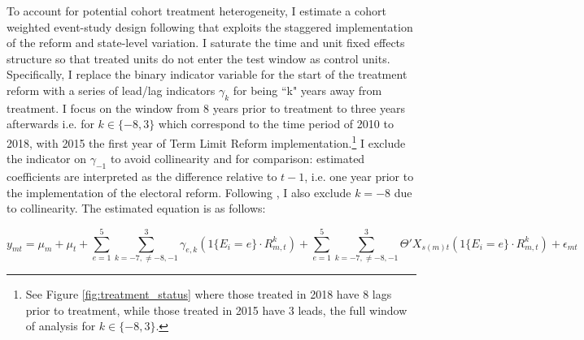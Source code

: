  To account for potential cohort treatment heterogeneity, I estimate  a cohort weighted event-study design following \citet{abraham_sun_2020} that exploits the staggered implementation of the reform and state-level variation. 
 I saturate the time and unit fixed effects structure so that treated units do not enter the test window as control units. Specifically, I replace the binary indicator variable for the start of the treatment reform with a series of lead/lag indicators $\gamma_k$ for being ``k" years away from treatment. I focus on the window from 8 years prior to treatment to three years afterwards i.e. for $k \in \{-8,3\} $ which correspond to the time period of 2010 to 2018, with 2015 the first year of Term Limit Reform implementation.\footnote{See Figure \ref{fig:treatment_status} where those treated in 2018 have 8 lags prior to treatment, while those treated in 2015 have 3 leads, the full window of analysis for $k \in \{-8,3\} $.} %
I exclude the indicator on $\gamma_{-1}$ to avoid collinearity and for comparison: estimated coefficients are interpreted as the difference relative to $t-1$, i.e. one year prior to the implementation of the electoral reform. Following   \citet{abraham_sun_2020}, I also exclude $k=-8$ due to collinearity. The estimated equation is as follows:


 
 \begin{equation}
\label{eq:abraham} 
y_{mt}=\mu_m + \mu_t + \sum^{5}_{e=1} \sum^3_{k=-7, \neq {-8,-1}} \gamma_{e,k}(1\{E_i=e\} \cdot R^k_{m,t}) + \sum^{5}_{e=1} \sum^3_{k=-7, \neq {-8,-1}}  \Theta'X_{s(m)t} (1\{E_i=e\} \cdot R^k_{m,t}) + \epsilon_{mt}
\end{equation} 
  
